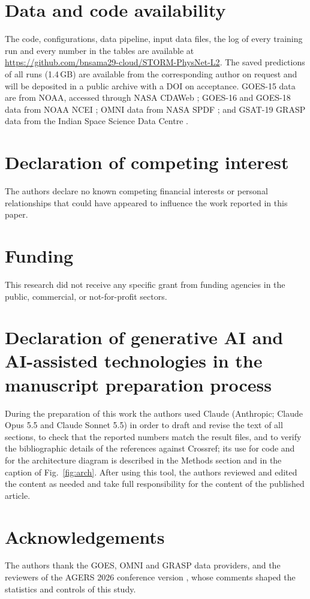 \documentclass[a4paper,fleqn]{cas-dc}
\begin{document}
\section*{Data and code availability}
The code, configurations, data pipeline, input data files, the log of every training run and every number in the
tables are available at \url{https://github.com/bnsama29-cloud/STORM-PhysNet-L2}. The saved predictions of all runs
(1.4\,GB) are available from the corresponding author on request and will be deposited in a public archive with a DOI on
acceptance. GOES-15 data are from NOAA, accessed through NASA
CDAWeb \citep{goes15_epead}; GOES-16 and GOES-18 data from NOAA NCEI \citep{ncei_goesr}; OMNI data from NASA
SPDF \citep{omni2020}; and GSAT-19 GRASP data from the Indian Space Science Data Centre \citep{grasp_issdc}.

\section*{Declaration of competing interest}
The authors declare no known competing financial interests or personal relationships that could have appeared
to influence the work reported in this paper.

\section*{Funding}
This research did not receive any specific grant from funding agencies in the public, commercial, or
not-for-profit sectors.

\printcredits

\section*{Declaration of generative AI and AI-assisted technologies in the manuscript preparation process}
During the preparation of this work the authors used Claude (Anthropic; Claude Opus 5.5 and Claude Sonnet 5.5) in
order to draft and revise the text of all sections, to check that the reported numbers match the result files,
and to verify the bibliographic details of the references against Crossref; its use for code and for the
architecture diagram is described in the Methods section and in the caption of Fig.~\ref{fig:arch}. After using this tool, the authors reviewed and edited the content as needed and take full
responsibility for the content of the published article.

\section*{Acknowledgements}
The authors thank the GOES, OMNI and GRASP data providers, and the reviewers of the AGERS 2026 conference
version \citep{bn2026agers}, whose comments shaped the statistics and controls of this study.



\end{document}
